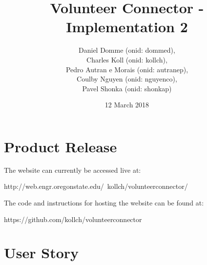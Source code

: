 \documentclass[12pt]{article}
\title{Volunteer Connector - Implementation 2}
\author{Daniel Domme (onid: dommed), \\
Charles Koll (onid: kollch), \\
Pedro Autran e Morais (onid: autranep), \\
Coulby Nguyen (onid: nguyenco), \\
Pavel Shonka (onid: shonkap)
}
\date{12 March 2018}
\begin{document}
\maketitle
\tableofcontents

\pagebreak
\section{Product Release}
	The website can currently be accessed live at:

	http://web.engr.oregonstate.edu/~kollch/volunteerconnector/

	\quad

	The code and instructions for hosting the website can be found at:

	https://github.com/kollch/volunteerconnector
\section{User Story}
\end{document}
